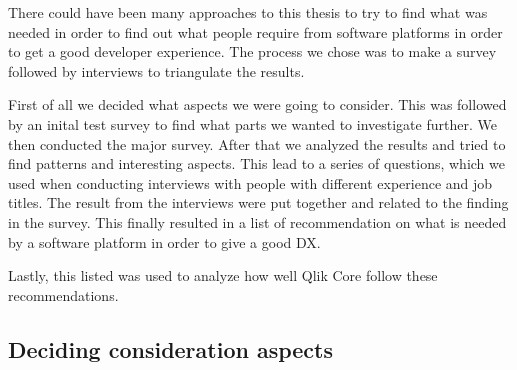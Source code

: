 \documentclass{article}
\begin{document}
There could have been many approaches to this thesis to try to find what was needed in order to find out
what people require from software platforms in order to get a good developer experience. The process we chose was to make
a survey followed by interviews to triangulate the results.

First of all we decided what aspects we were going to consider. This was followed by an inital test survey to find what
parts we wanted to investigate further. We then conducted the major survey. After that we analyzed the results and tried to find
patterns and interesting aspects. This lead to a series of questions, which we used when conducting interviews with people with
different experience and job titles. The result from the interviews were put together and related to the finding in the survey.
This finally resulted in a list of recommendation on what is needed by a software platform in order to give a good DX.

Lastly, this listed was used to analyze how well Qlik Core follow these recommendations.

\subsection{Deciding consideration aspects}
\end{document}

